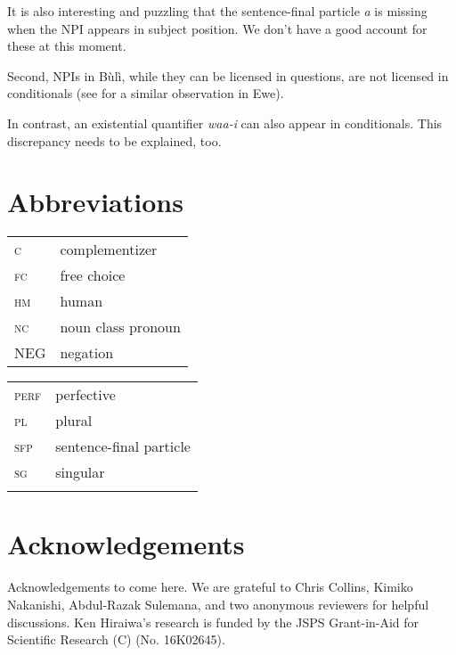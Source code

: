 \documentclass[output=paper,colorlinks,citecolor=brown]{langscibook}
\begin{document}
It is also interesting and puzzling that the sentence-final particle \textit{a} is missing when the NPI appears in subject position. We don't have a good account for these at this moment.

Second, NPIs in Bùlì, while they can be licensed in questions, are not licensed in conditionals (see \citealt{CollinsEtAl2017} for a similar observation in Ewe).

\z
In contrast, an existential quantifier \textit{waa-i} can also appear in conditionals. This discrepancy needs to be explained, too.


\z


\section*{Abbreviations}
\begin{tabularx}{.45\textwidth}{lQ}
\textsc{c} & complementizer\\
 \textsc{fc} & free choice\\
 \textsc{hm} & human\\
 \textsc{nc} & noun class pronoun\\
 NEG & negation
 \end{tabularx}
\begin{tabularx}{.45\textwidth}{lQ}
 \textsc{perf} & perfective\\
 \textsc{pl} & plural\\
 \textsc{sfp} & sentence-final particle\\
 \textsc{sg} & singular\\
 \\
 \end{tabularx}

\section*{Acknowledgements}
Acknowledgements to come here. We are grateful to Chris Collins, Kimiko Nakanishi,  Abdul-Razak Sulemana, and two anonymous reviewers for helpful discussions.
Ken Hiraiwa's research is funded by the JSPS Grant-in-Aid for Scientific Research (C) (No. 16K02645).

\printbibliography[heading=subbibliography,notkeyword=this]
\end{document}
